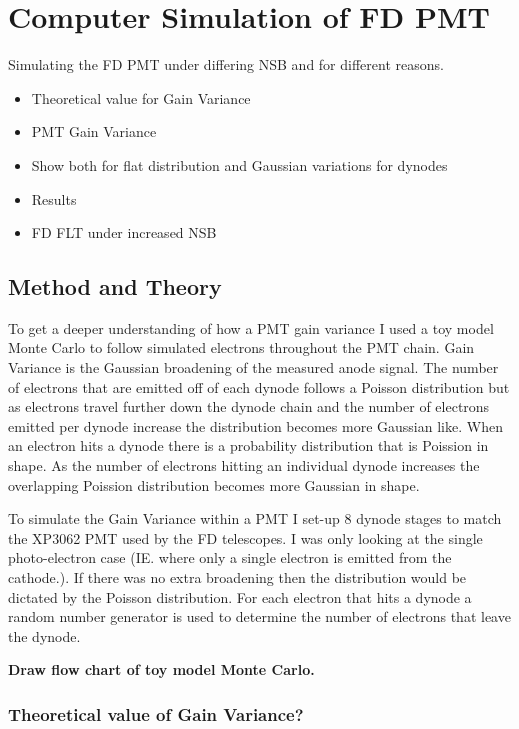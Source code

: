 \chapter[Computer Simulation of FD PMT]{\centering Computer Simulation of FD PMT \\}\label{Ch:CompSimPMT}

Simulating the FD PMT under differing NSB and for different reasons.
\begin{itemize}
\item Theoretical value for Gain Variance
\item PMT Gain Variance
\item Show both for flat distribution and Gaussian variations for dynodes
\item Results
\item FD FLT under increased NSB
\end{itemize}



\section{Method and Theory}

To get a deeper understanding of how a PMT gain variance I used a toy model Monte Carlo to follow simulated electrons throughout the PMT chain. Gain Variance is the Gaussian broadening of the measured anode signal. The number of electrons that are emitted off of each dynode follows a Poisson distribution but as electrons travel further down the dynode chain and the number of electrons emitted per dynode increase the distribution becomes more Gaussian like. When an electron hits a dynode there is a probability distribution that is Poission in shape. As the number of electrons hitting an individual dynode increases the overlapping Poission distribution becomes more Gaussian in shape.

To simulate the Gain Variance within a PMT I set-up 8 dynode stages to match the XP3062 PMT used by the FD telescopes. I was only looking at the single photo-electron case (IE. where only a single electron is emitted from the cathode.). If there was no extra broadening then the distribution would be dictated by the Poisson distribution. For each electron that hits a dynode a random number generator is used to determine the number of electrons that leave the dynode.

\textbf{Draw flow chart of toy model Monte Carlo.}

\subsection{Theoretical value of Gain Variance?}

